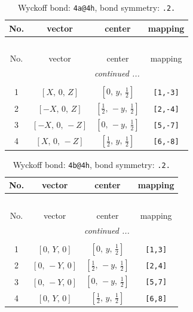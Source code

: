 \documentclass[fleqn,8pt]{jsarticle}
\begin{document}
\begin{longtable}{cccc}
\caption{Wyckoff bond: {\tt 4a@4h}, bond symmetry: {\tt .2.}}
 \\
 \hline \hline
No. & vector & center & mapping \\ \hline \endfirsthead

\multicolumn{3}{l}{\tablename\ \thetable{}} \\
 \hline \hline
No. & vector & center & mapping \\ \hline \endhead

 \hline \hline
\multicolumn{3}{r}{\footnotesize\it continued ...} \\ \endfoot

 \hline \hline
\multicolumn{3}{r}{} \\ \endlastfoot

1 & $\left[ X,\, 0,\, Z \right]$ & $\left[ 0,\, y,\, \frac{1}{2} \right]$ & {\tt [1,-3]} \\ \hline
2 & $\left[ - X,\, 0,\, Z \right]$ & $\left[ \frac{1}{2},\, - y,\, \frac{1}{2} \right]$ & {\tt [2,-4]} \\ \hline
3 & $\left[ - X,\, 0,\, - Z \right]$ & $\left[ 0,\, - y,\, \frac{1}{2} \right]$ & {\tt [5,-7]} \\ \hline
4 & $\left[ X,\, 0,\, - Z \right]$ & $\left[ \frac{1}{2},\, y,\, \frac{1}{2} \right]$ & {\tt [6,-8]} \\
\end{longtable}
\renewcommand{\arraystretch}{1.2}
\begin{longtable}{cccc}
\caption{Wyckoff bond: {\tt 4b@4h}, bond symmetry: {\tt .2.}}
 \\
 \hline \hline
No. & vector & center & mapping \\ \hline \endfirsthead

\multicolumn{3}{l}{\tablename\ \thetable{}} \\
 \hline \hline
No. & vector & center & mapping \\ \hline \endhead

 \hline \hline
\multicolumn{3}{r}{\footnotesize\it continued ...} \\ \endfoot

 \hline \hline
\multicolumn{3}{r}{} \\ \endlastfoot

1 & $\left[ 0,\, Y,\, 0 \right]$ & $\left[ 0,\, y,\, \frac{1}{2} \right]$ & {\tt [1,3]} \\ \hline
2 & $\left[ 0,\, - Y,\, 0 \right]$ & $\left[ \frac{1}{2},\, - y,\, \frac{1}{2} \right]$ & {\tt [2,4]} \\ \hline
3 & $\left[ 0,\, - Y,\, 0 \right]$ & $\left[ 0,\, - y,\, \frac{1}{2} \right]$ & {\tt [5,7]} \\ \hline
4 & $\left[ 0,\, Y,\, 0 \right]$ & $\left[ \frac{1}{2},\, y,\, \frac{1}{2} \right]$ & {\tt [6,8]} \\
\end{longtable}
\end{document}
